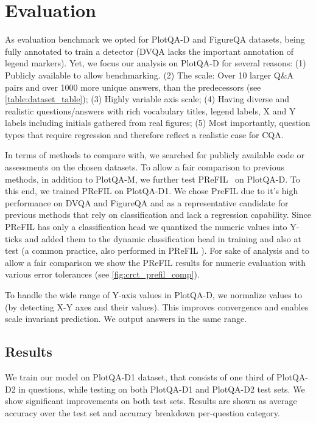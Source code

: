 \documentclass[runningheads]{llncs}
\begin{document}
\section{Evaluation}
\label{sec:Evaluation}
As evaluation benchmark we opted for PlotQA-D and FigureQA datasets, being fully annotated to train a detector (DVQA lacks the important annotation of legend markers). Yet, we focus our analysis on PlotQA-D for several reasons: (1) Publicly available to allow benchmarking. (2) The scale: Over 10 larger Q\&A pairs and over 1000 more unique answers, than the predecessors (see \cref{table:dataset_table}); (3) Highly variable axis scale; (4) Having diverse and realistic questions/answers with rich vocabulary titles, legend labels, X and Y labels including initials gathered from real figures; (5) Most importantly, question types that require regression and therefore reflect a realistic case for CQA.

In terms of methods to compare with, we searched for publicly available code or assessments on the chosen datasets. 
To allow a fair comparison to previous methods, in addition to PlotQA-M,  we further test PReFIL~\cite{prefil} on PlotQA-D. To this end, we trained PReFIL on PlotQA-D1. We chose PreFIL due to it's high performance on DVQA and FigureQA and as a representative candidate for previous methods that rely on classification and lack a regression capability. Since PReFIL has only a classification head we quantized the numeric values into Y-ticks and added them to the dynamic classification head in training and also at test (a common practice, also performed in PReFIL \cite{prefil}). For sake of analysis and to allow a fair comparison we show the PReFIL results for numeric evaluation with various error tolerances (see \cref{fig:crct_prefil_comp}).


To handle the wide range of Y-axis values in PlotQA-D, we normalize values to  (by detecting X-Y axes and their values). This improves convergence and enables scale invariant prediction. We output answers in the same range. 
\subsection{Results}We train our model on PlotQA-D1 dataset, that consists of one third of PlotQA-D2 in questions, while testing on both PlotQA-D1 and PlotQA-D2 test sets. We show significant improvements on both test sets. Results are shown as average accuracy over the test set and accuracy breakdown per-question category.
\end{document}
